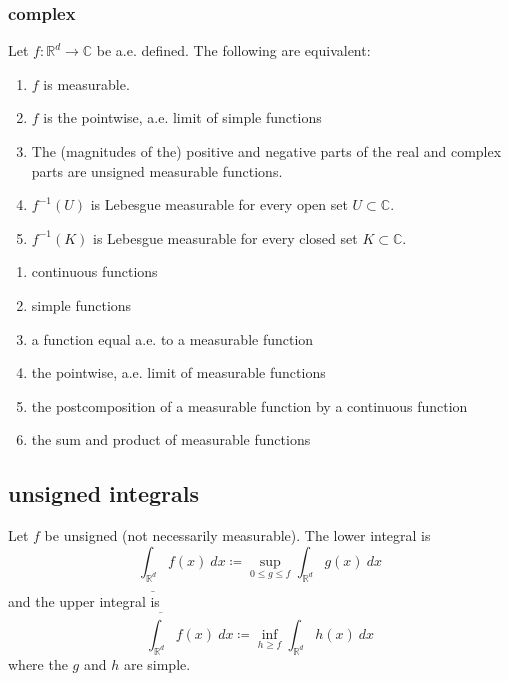 \documentclass[12pt]{article}
\begin{document}

\subsubsection{complex} %

\begin{definition}
	Let $f:\mathbb{R}^d\to\mathbb{C}$ be a.e. defined. The following are equivalent: \hfill
	\begin{enumerate}
		\item $f$ is measurable.
		\item $f$ is the pointwise, a.e. limit of simple functions
		\item The (magnitudes of the) positive and negative parts of the real and complex parts are unsigned measurable functions.
		\item $f^{-1}(U)$ is Lebesgue measurable for every open set $U\subset\mathbb{C}$.
		\item $f^{-1}(K)$ is Lebesgue measurable for every closed set $K\subset\mathbb{C}$.
	\end{enumerate}
\end{definition}

\begin{proposition} \hfill
	\begin{enumerate}
		\item continuous functions 
		\item simple functions 
		\item a function equal a.e. to a measurable function
		\item the pointwise, a.e. limit of measurable functions 
		\item the postcomposition of a measurable function by a continuous function 
		\item the sum and product of measurable functions
	\end{enumerate}
\end{proposition}



\subsection{unsigned integrals} %

\begin{definition}
	Let $f$ be unsigned (not necessarily measurable). The lower integral is 
	\begin{equation*}
		\underline{\int_{\mathbb{R}^d}}f(x)\ dx\coloneqq\sup_{0\leq g\leq f}\int_{\mathbb{R}^d}g(x)\ dx
	\end{equation*}
	and the upper integral is 
	\begin{equation*}
		\overline{\int_{\mathbb{R}^d}}f(x) \ dx\coloneqq\inf_{h\geq f}\int_{\mathbb{R}^d}h(x)\ dx
	\end{equation*}
	where the $g$ and $h$ are simple.
\end{definition}
\end{document}
